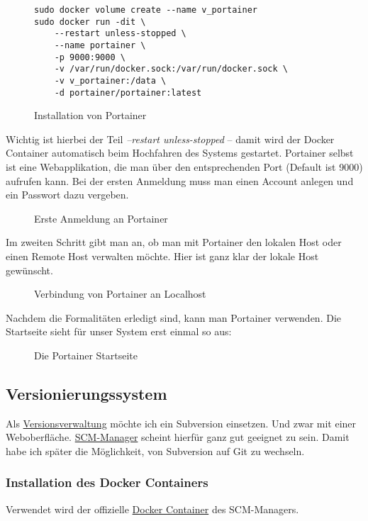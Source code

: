 \documentclass[12pt,a4paper]{article}
\newcommand{\code}[1]{\textit{#1}}
\newcommand{\jpaimg}[2]{\begin{figure}[H]\centering\fbox{\texttt{[image: \#1]}}\caption{#2}\label{fig:#2}\end{figure}}
\newcommand{\jpaquote}[1]{\glqq{}#1\grqq{}}
\begin{document}
\begin{figure}[H]
\begin{lstlisting}
sudo docker volume create --name v_portainer
sudo docker run -dit \
    --restart unless-stopped \
    --name portainer \
    -p 9000:9000 \
    -v /var/run/docker.sock:/var/run/docker.sock \
    -v v_portainer:/data \
    -d portainer/portainer:latest
\end{lstlisting}
\caption{Installation von Portainer}\label{fig:Installation von Portainer}
\end{figure}

Wichtig ist hierbei der Teil \code{--restart unless-stopped} -- damit wird der Docker Container automatisch beim
Hochfahren des Systems gestartet. Portainer selbst ist eine Webapplikation, die man über den entsprechenden Port
(Default ist 9000) aufrufen kann. Bei der ersten Anmeldung muss man einen Account anlegen und ein Passwort dazu vergeben.

\jpaimg{./images/Portainer-01.png}{Erste Anmeldung an Portainer}

Im zweiten Schritt gibt man an, ob man mit Portainer den lokalen Host oder einen Remote Host verwalten möchte. Hier ist
ganz klar der lokale Host gewünscht.

\jpaimg{./images/Portainer-02.png}{Verbindung von Portainer an Localhost}

Nachdem die \jpaquote{Formalitäten} erledigt sind, kann man Portainer verwenden. Die Startseite sieht für unser System
erst einmal so aus:

\jpaimg{./images/Portainer-03.png}{Die Portainer Startseite}

\subsection{Versionierungssystem}\label{sub:SCM-Manager}
Als \href{https://de.wikipedia.org/wiki/Versionsverwaltung}{Versionsverwaltung} möchte ich ein Subversion einsetzen.
Und zwar mit einer Web\-oberfläche. \href{https://www.scm-manager.org/}{SCM-Manager} scheint hierfür ganz gut geeignet
zu sein. Damit habe ich später die Möglichkeit, von Subversion auf Git zu wechseln.

\subsubsection{Installation des Docker Containers}
Verwendet wird der offizielle \href{https://hub.docker.com/r/sdorra/scm-manager}{Docker Container} des SCM-Managers.
\end{document}
